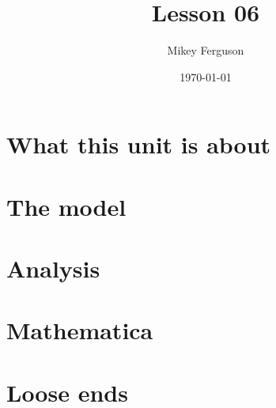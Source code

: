 \documentclass[11pt]{article}
\title{Lesson 06}
\author{Mikey Ferguson}
\date{\today}
\begin{document}
\maketitle
\tableofcontents
\bigskip

\section{What this unit is about}

\section{The model}

\section{Analysis}

\section{Mathematica}

\section{Loose ends}
\end{document}
